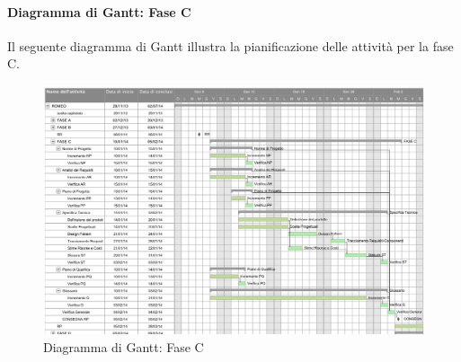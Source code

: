 \paragraph{Diagramma di Gantt: Fase C }
\label{DiagrammaArchitetturale}
Il seguente diagramma di Gantt\g{} illustra la pianificazione delle attività per la fase C.
\begin{figure}[h]
	\centering
	\includegraphics[width=1.2\textwidth]{./content/Immagini/faseC.png}
	\caption{Diagramma di Gantt: Fase C}
\end{figure}
\pagebreak
